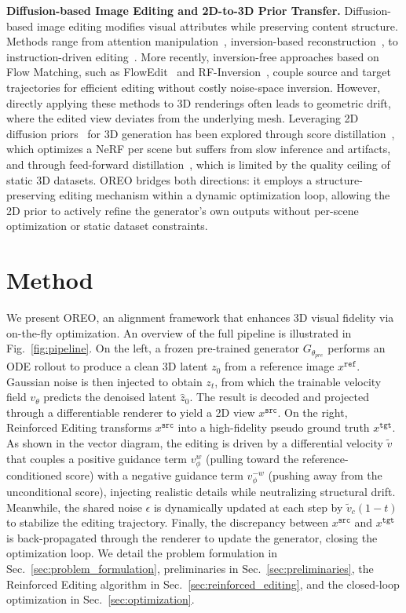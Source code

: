 \documentclass[runningheads]{llncs}
\begin{document}
\noindent\textbf{Diffusion-based Image Editing and 2D-to-3D Prior Transfer.}
Diffusion-based image editing modifies visual attributes while preserving content structure.
Methods range from attention manipulation~\cite{hertz2022prompt,parmar2023zero}, inversion-based reconstruction~\cite{mokady2023null,udandarao2023sus}, to instruction-driven editing~\cite{brooks2023instructpix2pix}.
More recently, inversion-free approaches based on Flow Matching, such as FlowEdit~\cite{couairon2024flowedit} and RF-Inversion~\cite{zhang2024rfinversion}, couple source and target trajectories for efficient editing without costly noise-space inversion.
However, directly applying these methods to 3D renderings often leads to geometric drift, where the edited view deviates from the underlying mesh.
Leveraging 2D diffusion priors~\cite{rombach2022high} for 3D generation has been explored through score distillation~\cite{poole2022dreamfusion,lin2023magic3d,wang2024prolificdreamer}, which optimizes a NeRF per scene but suffers from slow inference and artifacts, and through feed-forward distillation~\cite{hong2023lrm,tang2024lgm}, which is limited by the quality ceiling of static 3D datasets.
OREO bridges both directions: it employs a structure-preserving editing mechanism within a dynamic optimization loop, allowing the 2D prior to actively refine the generator's own outputs without per-scene optimization or static dataset constraints.

\section{Method}
\label{sec:method}

We present OREO, an alignment framework that enhances 3D visual fidelity via on-the-fly optimization.
An overview of the full pipeline is illustrated in Fig.~\ref{fig:pipeline}.
On the left, a frozen pre-trained generator $G_{\theta_{pre}}$ performs an ODE rollout to produce a clean 3D latent $z_0$ from a reference image $x^{\texttt{ref}}$.
Gaussian noise is then injected to obtain $z_t$, from which the trainable velocity field $v_\theta$ predicts the denoised latent $\hat{z}_0$.
The result is decoded and projected through a differentiable renderer to yield a 2D view $x^{\texttt{src}}$.
On the right, Reinforced Editing transforms $x^{\texttt{src}}$ into a high-fidelity pseudo ground truth $x^{\texttt{tgt}}$.
As shown in the vector diagram, the editing is driven by a differential velocity $\tilde{v}$ that couples a positive guidance term $v_\phi^{w}$ (pulling toward the reference-conditioned score) with a negative guidance term $v_\phi^{-w}$ (pushing away from the unconditional score), injecting realistic details while neutralizing structural drift.
Meanwhile, the shared noise $\epsilon$ is dynamically updated at each step by $\tilde{v}_c(1-t)$ to stabilize the editing trajectory.
Finally, the discrepancy between $x^{\texttt{src}}$ and $x^{\texttt{tgt}}$ is back-propagated through the renderer to update the generator, closing the optimization loop.
We detail the problem formulation in Sec.~\ref{sec:problem_formulation}, preliminaries in Sec.~\ref{sec:preliminaries}, the Reinforced Editing algorithm in Sec.~\ref{sec:reinforced_editing}, and the closed-loop optimization in Sec.~\ref{sec:optimization}.
\end{document}
